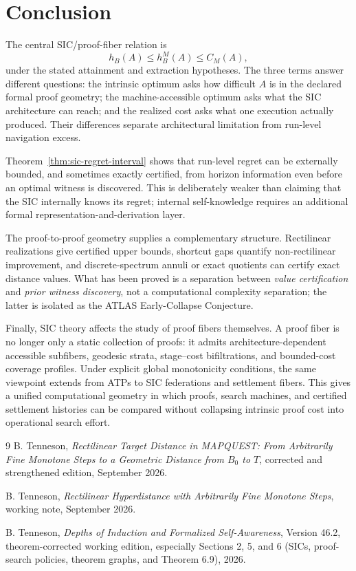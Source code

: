 \documentclass[11pt]{article}
\theoremstyle{definition}
\begin{document}
\section{Conclusion}

The central SIC/proof-fiber relation is
\[
\boxed{
h_B(A)\le h_B^M(A)\le C_M(A),
}
\]
under the stated attainment and extraction hypotheses.  The three terms answer different questions: the intrinsic optimum asks how difficult $A$ is in the declared formal proof geometry; the machine-accessible optimum asks what the SIC architecture can reach; and the realized cost asks what one execution actually produced.  Their differences separate architectural limitation from run-level navigation excess.

Theorem~\ref{thm:sic-regret-interval} shows that run-level regret can be externally bounded, and sometimes exactly certified, from horizon information even before an optimal witness is discovered.  This is deliberately weaker than claiming that the SIC internally knows its regret; internal self-knowledge requires an additional formal representation-and-derivation layer.

The proof-to-proof geometry supplies a complementary structure.  Rectilinear realizations give certified upper bounds, shortcut gaps quantify non-rectilinear improvement, and discrete-spectrum annuli or exact quotients can certify exact distance values.  What has been proved is a separation between \emph{value certification} and \emph{prior witness discovery}, not a computational complexity separation; the latter is isolated as the ATLAS Early-Collapse Conjecture.

Finally, SIC theory affects the study of proof fibers themselves.  A proof fiber is no longer only a static collection of proofs: it admits architecture-dependent accessible subfibers, geodesic strata, stage--cost bifiltrations, and bounded-cost coverage profiles.  Under explicit global monotonicity conditions, the same viewpoint extends from ATPs to SIC federations and settlement fibers.  This gives a unified computational geometry in which proofs, search machines, and certified settlement histories can be compared without collapsing intrinsic proof cost into operational search effort.

\begin{thebibliography}{9}
B. Tenneson, \emph{Rectilinear Target Distance in MAPQUEST: From Arbitrarily Fine Monotone Steps to a Geometric Distance from $B_0$ to $T$}, corrected and strengthened edition, September 2026.

B. Tenneson, \emph{Rectilinear Hyperdistance with Arbitrarily Fine Monotone Steps}, working note, September 2026.

B. Tenneson, \emph{Depths of Induction and Formalized Self-Awareness}, Version 46.2, theorem-corrected working edition, especially Sections 2, 5, and 6 (SICs, proof-search policies, theorem graphs, and Theorem 6.9), 2026.
\end{thebibliography}
\end{document}
